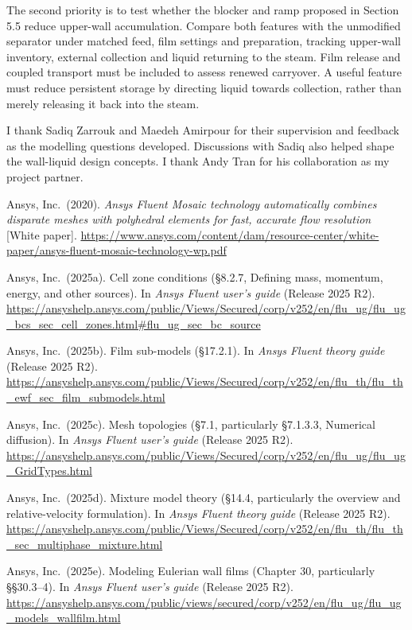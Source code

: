 \documentclass[12pt]{article}
\begin{document}
The second priority is to test whether the blocker and ramp proposed in Section 5.5 reduce upper-wall accumulation. Compare both features with the unmodified separator under matched feed, film settings and preparation, tracking upper-wall inventory, external collection and liquid returning to the steam. Film release and coupled transport must be included to assess renewed carryover. A useful feature must reduce persistent storage by directing liquid towards collection, rather than merely releasing it back into the steam.

\clearpage{}
I thank Sadiq Zarrouk and Maedeh Amirpour for their supervision and feedback as the modelling questions developed. Discussions with Sadiq also helped shape the wall-liquid design concepts. I thank Andy Tran for his collaboration as my project partner.

\clearpage{}\begingroup\raggedright{}\setlength{\parindent}{-1.27cm}\setlength{\leftskip}{1.27cm}
Ansys, Inc.~(2020). \emph{Ansys Fluent Mosaic technology automatically combines disparate meshes with polyhedral elements for fast, accurate flow resolution} {[}White paper{]}. \url{https://www.ansys.com/content/dam/resource-center/white-paper/ansys-fluent-mosaic-technology-wp.pdf}

Ansys, Inc.~(2025a). Cell zone conditions (§8.2.7, Defining mass, momentum, energy, and other sources). In \emph{Ansys Fluent user's guide} (Release 2025 R2). \url{https://ansyshelp.ansys.com/public/Views/Secured/corp/v252/en/flu_ug/flu_ug_bcs_sec_cell_zones.html\#flu_ug_sec_bc_source}

Ansys, Inc.~(2025b). Film sub-models (§17.2.1). In \emph{Ansys Fluent theory guide} (Release 2025 R2). \url{https://ansyshelp.ansys.com/public/Views/Secured/corp/v252/en/flu_th/flu_th_ewf_sec_film_submodels.html}

Ansys, Inc.~(2025c). Mesh topologies (§7.1, particularly §7.1.3.3, Numerical diffusion). In \emph{Ansys Fluent user's guide} (Release 2025 R2). \url{https://ansyshelp.ansys.com/public/Views/Secured/corp/v252/en/flu_ug/flu_ug_GridTypes.html}

Ansys, Inc.~(2025d). Mixture model theory (§14.4, particularly the overview and relative-velocity formulation). In \emph{Ansys Fluent theory guide} (Release 2025 R2). \url{https://ansyshelp.ansys.com/public/Views/Secured/corp/v252/en/flu_th/flu_th_sec_multiphase_mixture.html}

Ansys, Inc.~(2025e). Modeling Eulerian wall films (Chapter 30, particularly §§30.3--4). In \emph{Ansys Fluent user's guide} (Release 2025 R2). \url{https://ansyshelp.ansys.com/public/views/secured/corp/v252/en/flu_ug/flu_ug_models_wallfilm.html}
\end{document}
